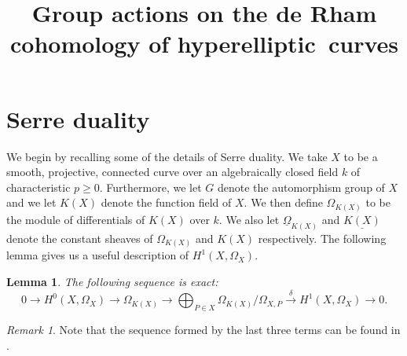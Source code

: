 \documentclass[draft, 11pt]{article} %
\title{Group actions on the de Rham cohomology of hyperelliptic~curves}
\author{}
\theoremstyle{plain}
\newtheorem{lem}[defn]{Lemma}
\theoremstyle{remark}
\newtheorem*{rem}{Remark}
\newcommand{\ra}{\rightarrow}
\newcommand{\hzero}{{H^0(X,\Omega_X)}}
\begin{document}
\maketitle

\listoftodos


\section{Serre duality}


We begin by recalling some of the details of Serre duality.
We take $X$ to be a smooth, projective, connected curve over an algebraically closed field $k$ of characteristic $p \geq 0$.
Furthermore, we let $G$ denote the automorphism group of $X$ and we let $K(X)$ denote the function field of $X$.
We then define $\Omega_{K(X)}$ to be the module of differentials of $K(X)$ over $k$.
We also let $\underline{\Omega}_{K(X)}$ and $\underline{K(X)}$ denote the constant sheaves of $\Omega_{K(X)}$ and $K(X)$ respectively.
The following lemma gives us a useful description of $H^1(X,\Omega_X)$.
\begin{lem}\label{exactsequencelemma}
The following sequence is exact:
\begin{equation}\label{dualityses}
0 \rightarrow \hzero \ra \Omega_{K(X)} \ra \bigoplus_{P \in X}\Omega_{K(X)}/\Omega_{X,P} \xrightarrow{\delta} H^1(X,\Omega_X) \ra 0.
\end{equation}
\end{lem}
\begin{rem}
Note that the sequence formed by the last three terms can be found in \cite[Pg. 248]{hart}.
\end{rem}
\end{document}
